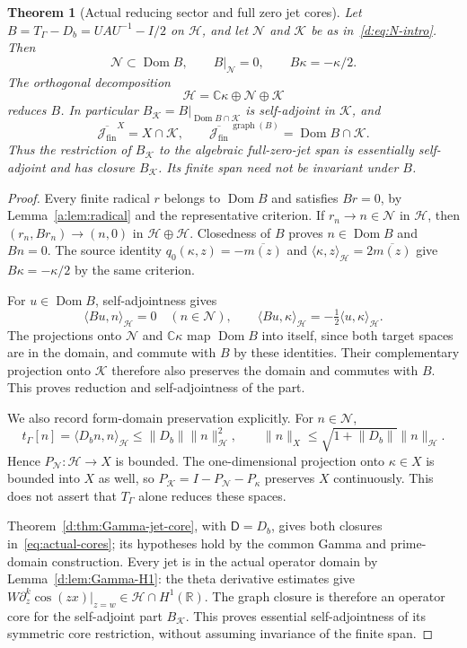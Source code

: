 \documentclass[11pt,a4paper]{article}
\numberwithin{equation}{section}
\newtheorem{theorem}{Theorem}[section]
\theoremstyle{definition}\newtheorem{definition}[theorem]{Definition}
\theoremstyle{remark}\newtheorem{remark}[theorem]{Remark}
\newcommand{\R}{\mathbb R}\newcommand{\C}{\mathbb C}\newcommand{\N}{\mathbb N}
\newcommand{\Hh}{\mathcal H}\newcommand{\Hw}{\mathcal H}
\newcommand{\tg}{t_\Gamma}\newcommand{\cg}{c_\Gamma}
\newcommand{\dom}{\operatorname{Dom}}\newcommand{\Var}{\operatorname{Var}}
\newcommand{\ip}[2]{\langle#1,#2\rangle}\newcommand{\norm}[1]{\lVert#1\rVert}\newcommand{\abs}[1]{\lvert#1\rvert}
\newcommand{\Nn}{\mathcal N}\newcommand{\Ii}{\mathcal I}\newcommand{\Zz}{\mathcal Z}
\newcommand{\Kk}{\mathcal K}\newcommand{\Aa}{\mathcal A}\newcommand{\Ff}{\mathcal F}
\begin{document}
\begin{theorem}[Actual reducing sector and full zero jet cores]\label{thm:actual-core}
Let $B=T_\Gamma-D_b=UAU^{-1}-I/2$ on $\Hh$, and let $\Nn$ and $\Kk$ be as in~\eqref{d:eq:N-intro}. Then
\begin{equation}\label{eq:actual-radical}
 \Nn\subset\dom B,\qquad B|_{\Nn}=0,\qquad B\kappa=-\kappa/2.
\end{equation}
The orthogonal decomposition
\begin{equation}\label{eq:actual-decomposition}
 \Hh=\C\kappa\oplus\Nn\oplus\Kk
\end{equation}
reduces $B$. In particular $B_{\Kk}=B|_{\dom B\cap\Kk}$ is self-adjoint in $\Kk$, and
\begin{equation}\label{eq:actual-cores}
 \overline{\mathcal J_{\mathrm{fin}}}^{X}=X\cap\Kk,
 \qquad
 \overline{\mathcal J_{\mathrm{fin}}}^{\,\operatorname{graph}(B)}
       =\dom B\cap\Kk.
\end{equation}
Thus the restriction of $B_{\Kk}$ to the algebraic full-zero-jet span is essentially self-adjoint and has closure $B_{\Kk}$. Its finite span need not be invariant under $B$.
\end{theorem}
\begin{proof}
Every finite radical $r$ belongs to $\dom B$ and satisfies $Br=0$, by Lemma~\ref{a:lem:radical} and the representative criterion. If $r_n\to n\in\Nn$ in $\Hh$, then $(r_n,Br_n)\to(n,0)$ in $\Hh\oplus\Hh$. Closedness of $B$ proves $n\in\dom B$ and $Bn=0$. The source identity $q_0(\kappa,z)=-\overline{m(z)}$ and $\ip\kappa z_{\Hh}=2\overline{m(z)}$ give $B\kappa=-\kappa/2$ by the same criterion.

For $u\in\dom B$, self-adjointness gives
\[
 \ip{Bu}{n}_{\Hh}=0\quad(n\in\Nn),\qquad
 \ip{Bu}{\kappa}_{\Hh}=-\tfrac12\ip u\kappa_{\Hh}.
\]
The projections onto $\Nn$ and $\C\kappa$ map $\dom B$ into itself, since both target spaces are in the domain, and commute with $B$ by these identities. Their complementary projection onto $\Kk$ therefore also preserves the domain and commutes with $B$. This proves reduction and self-adjointness of the part.

We also record form-domain preservation explicitly. For $n\in\Nn$,
\[
 \tg[n]=\ip{D_bn}{n}_{\Hh}\le\norm{D_b}\norm n_{\Hh}^2,
 \qquad \norm n_X\le\sqrt{1+\norm{D_b}}\norm n_{\Hh}.
\]
Hence $P_{\Nn}:\Hh\to X$ is bounded. The one-dimensional projection onto $\kappa\in X$ is bounded into $X$ as well, so $P_{\Kk}=I-P_{\Nn}-P_{\kappa}$ preserves $X$ continuously. This does not assert that $T_\Gamma$ alone reduces these spaces.

Theorem~\ref{d:thm:Gamma-jet-core}, with $\mathsf D=D_b$, gives both closures in~\eqref{eq:actual-cores}; its hypotheses hold by the common Gamma and prime-domain construction. Every jet is in the actual operator domain by Lemma~\ref{d:lem:Gamma-H1}: the theta derivative estimates give $W\partial_z^k\cos(zx)|_{z=w}\in\Hh\cap H^1(\R)$. The graph closure is therefore an operator core for the self-adjoint part $B_{\Kk}$. This proves essential self-adjointness of its symmetric core restriction, without assuming invariance of the finite span.
\end{proof}
\end{document}
